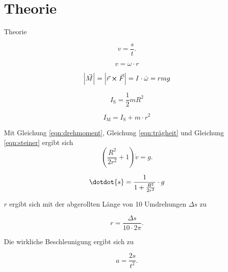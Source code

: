\section{Theorie}
\begin{frame}{Theorie}
    
    \begin{equation}
        v= \frac{s}{t}.
    \end{equation}
    
    \begin{equation}
        v = \omega \cdot r
    \end{equation}

    \begin{equation}
        \abs{\vec{M}} = \abs{ \vec{r} \cross \vec{F} } = I \cdot \dot{\omega} = r m g
        \label{eqn:drehmoment}
    \end{equation}

    \begin{equation}
        I_\text{S}= \frac{1}{2} m R^2 
        \label{eqn:trägheit}
    \end{equation}

    \begin{equation}
        I_\text{M} = I_\text{S}+ m \cdot r^2
        \label{eqn:steiner}
    \end{equation}

    Mit Gleichung \ref{eqn:drehmoment}, Gleichung \ref{eqn:trägheit} und Gleichung \ref{eqn:steiner} ergibt sich
    \begin{equation}
        (\frac{R^2}{2 r^2} +1) \dot{v} = g.
    \end{equation}
    
    \begin{equation}
        \dotdot{s} = \frac{1}{1 + \frac{R^2}{2r^2}} \cdot g
    \end{equation}

    $r$ ergibt sich mit der abgerollten Länge von 10 Umdrehungen $\Delta s$ zu

    \begin{equation}
        r = \frac{\Delta s}{10 \cdot 2\pi}.
    \end{equation}

    Die wirkliche Beschleunigung ergibt sich zu 
    
    \begin{equation}
        a = \frac{2s}{t^2}.
    \end{equation}

\end{frame}
